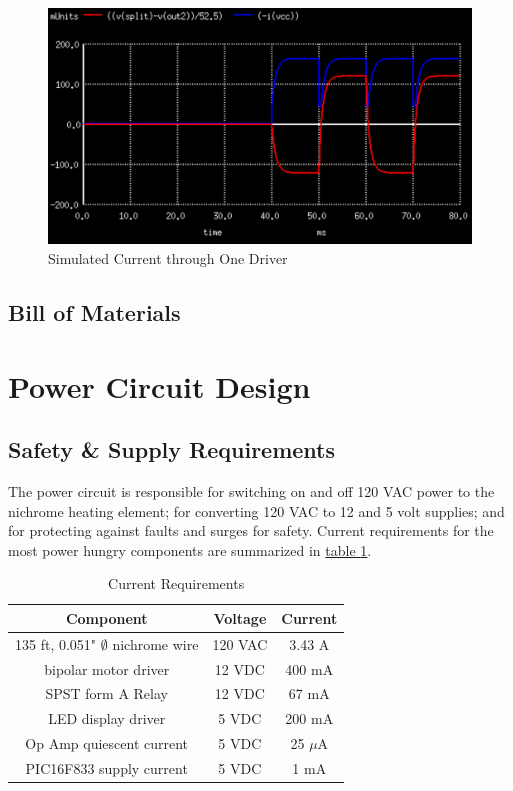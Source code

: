 \documentclass[10pt, twocolumn]{article}
\begin{document}
\begin{figure}
	\centering
	\includegraphics[width=0.9\columnwidth]{Figures/motor-driver-current-simulation.pdf}
	\caption{Simulated Current through One Driver}
	\label{motor-driver-current-simulation}
\end{figure}

\subsection{Bill of Materials}

\section{Power Circuit Design}

\subsection{Safety \& Supply Requirements}

The power circuit is responsible for switching on and off 120 VAC power
to the nichrome heating element; for converting 120 VAC to 12 and 5 volt
supplies; and for protecting against faults and surges for safety.
Current requirements for the most power hungry components are summarized in
\hyperref[current-requirements-table]{table \ref{current-requirements-table}}.

\begin{table}
	\centering
	\small
	\caption{Current Requirements}
	\begin{tabular}{c c c}
		\hline\hline
		Component					&Voltage	&Current	\\
		\hline
		135 ft, 0.051" $\emptyset$ nichrome wire	&120 VAC	&3.43 A	\\
		bipolar motor driver		&12 VDC		&400 mA	\\
		SPST form A Relay				&12 VDC		&67 mA	\\
		LED display driver				&5 VDC		&200 mA	\\
		Op Amp quiescent current			&5 VDC		&25 $\mu$A	\\
		PIC16F833 supply current			&5 VDC		&1 mA	\\
		\hline\hline
	\end{tabular}
	\label{current-requirements-table}
\end{table}
\end{document}
